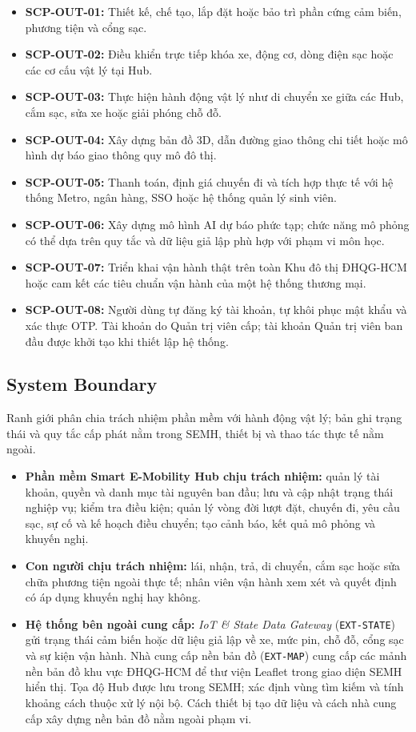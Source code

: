 \begin{itemize}
  \item \textbf{SCP-OUT-01:} Thiết kế, chế tạo, lắp đặt hoặc bảo trì phần cứng cảm biến, phương tiện và cổng sạc.
  \item \textbf{SCP-OUT-02:} Điều khiển trực tiếp khóa xe, động cơ, dòng điện sạc hoặc các cơ cấu vật lý tại Hub.
  \item \textbf{SCP-OUT-03:} Thực hiện hành động vật lý như di chuyển xe giữa các Hub, cắm sạc, sửa xe hoặc giải phóng chỗ đỗ.
  \item \textbf{SCP-OUT-04:} Xây dựng bản đồ 3D, dẫn đường giao thông chi tiết hoặc mô hình dự báo giao thông quy mô đô thị.
  \item \textbf{SCP-OUT-05:} Thanh toán, định giá chuyến đi và tích hợp thực tế với hệ thống Metro, ngân hàng, SSO hoặc hệ thống quản lý sinh viên.
  \item \textbf{SCP-OUT-06:} Xây dựng mô hình AI dự báo phức tạp; chức năng mô phỏng có thể dựa trên quy tắc và dữ liệu giả lập phù hợp với phạm vi môn học.
  \item \textbf{SCP-OUT-07:} Triển khai vận hành thật trên toàn Khu đô thị ĐHQG-HCM hoặc cam kết các tiêu chuẩn vận hành của một hệ thống thương mại.
  \item \textbf{SCP-OUT-08:} Người dùng tự đăng ký tài khoản, tự khôi phục mật khẩu và xác thực OTP. Tài khoản do Quản trị viên cấp; tài khoản Quản trị viên ban đầu được khởi tạo khi thiết lập hệ thống.
\end{itemize}

\subsection{System Boundary}

Ranh giới phân chia trách nhiệm phần mềm với hành động vật lý; bản ghi trạng thái và quy tắc cấp phát nằm trong SEMH, thiết bị và thao tác thực tế nằm ngoài.

\begin{itemize}
  \item \textbf{Phần mềm Smart E-Mobility Hub chịu trách nhiệm:} quản lý tài khoản, quyền và danh mục tài nguyên ban đầu; lưu và cập nhật trạng thái nghiệp vụ; kiểm tra điều kiện; quản lý vòng đời lượt đặt, chuyến đi, yêu cầu sạc, sự cố và kế hoạch điều chuyển; tạo cảnh báo, kết quả mô phỏng và khuyến nghị.
  \item \textbf{Con người chịu trách nhiệm:} lái, nhận, trả, di chuyển, cắm sạc hoặc sửa chữa phương tiện ngoài thực tế; nhân viên vận hành xem xét và quyết định có áp dụng khuyến nghị hay không.
  \item \textbf{Hệ thống bên ngoài cung cấp:} \textit{IoT \& State Data Gateway} (\texttt{EXT-STATE}) gửi trạng thái cảm biến hoặc dữ liệu giả lập về xe, mức pin, chỗ đỗ, cổng sạc và sự kiện vận hành. Nhà cung cấp nền bản đồ (\texttt{EXT-MAP}) cung cấp các mảnh nền bản đồ khu vực ĐHQG-HCM để thư viện Leaflet trong giao diện SEMH hiển thị. Tọa độ Hub được lưu trong SEMH; xác định vùng tìm kiếm và tính khoảng cách thuộc xử lý nội bộ. Cách thiết bị tạo dữ liệu và cách nhà cung cấp xây dựng nền bản đồ nằm ngoài phạm vi.
\end{itemize}

